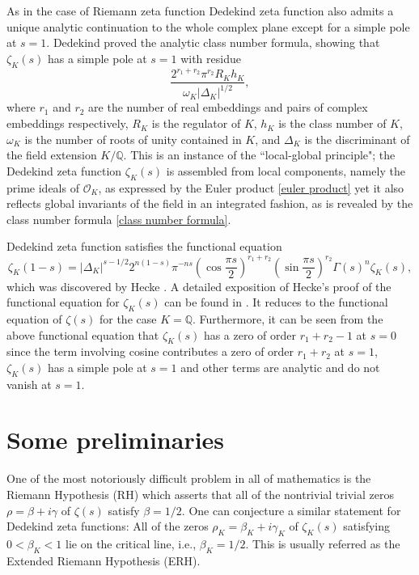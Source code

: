 \documentclass[12pt]{amsart}
\numberwithin{equation}{section}
\theoremstyle{myplain}
\theoremstyle{mydefinition}
\theoremstyle{plain}
\theoremstyle{definition}
\def\Q{{\mathbb Q}}
\begin{document}
As in the case of Riemann zeta function Dedekind zeta function also admits a unique analytic continuation to the whole complex plane except for a simple pole at $s = 1$. Dedekind proved the analytic class number formula, showing that $\zeta_K(s)$ has a simple pole at $s = 1$ with residue
\begin{equation} \label{class number formula}
\frac{2^{r_1 + r_2} \pi^{r_2} R_K h_K}{\omega_K |\Delta_K|^{1/2}},
\end{equation}
where $r_1$ and $r_2$ are the number of real embeddings and pairs of complex embeddings respectively, $R_K$ is the regulator of $K$, $h_K$ is the class number of $K$, $\omega_K$ is the number of roots of unity contained in $K$, and $\Delta_K$ is the discriminant of the field extension $K/\Q$. This is an instance of the ``local-global principle"; the Dedekind zeta function $\zeta_K(s)$ is assembled from local components, namely the prime ideals of $\mathcal{O}_K$, as expressed by the Euler product \eqref{euler product} yet it also reflects global invariants of the field in an integrated fashion, as is revealed by the class number formula \eqref{class number formula}.

\vspace{2pt}


Dedekind zeta function satisfies the functional equation
\[
\zeta_K(1-s) = |\Delta_K|^{s - 1/2} 2^{n(1-s)} \pi^{-ns} \left( \cos \frac{\pi s}{2} \right)^{r_1 + r_2}  \left( \sin \frac{\pi s}{2} \right)^{r_2} \Gamma(s)^n \zeta_K(s),
\]
which was discovered by Hecke \cite{hecke1917zetafunktion}. A detailed exposition of Hecke's proof of the functional equation for $\zeta_K(s)$ can be found in \cite[Chap.~7, §5]{Neukirch}. It reduces to the functional equation of $\zeta(s)$ for the case $K = \Q$. Furthermore, it can be seen from the above functional equation that $\zeta_K(s)$ has a zero of order $r_1 + r_2 - 1$ at $s = 0$ since the term involving cosine contributes a zero of order $r_1 + r_2$ at $s = 1$, $\zeta_K(s)$ has a simple pole at $s = 1$ and other terms are analytic and do not vanish at $s = 1$.


\section{Some preliminaries}


One of the most notoriously difficult problem in all of mathematics is the Riemann Hypothesis (RH) which asserts that all of the nontrivial trivial zeros $\rho = \beta + i \gamma$ of $\zeta(s)$ satisfy $\beta = 1/2$. One can conjecture a similar statement for Dedekind zeta functions: All of the zeros $\rho_K = \beta_K + i \gamma_K$ of $\zeta_K(s)$ satisfying $0 < \beta_K < 1$ lie on the critical line, i.e., $\beta_K = 1/2$. This is usually referred as the Extended Riemann Hypothesis (ERH). 
\end{document}
